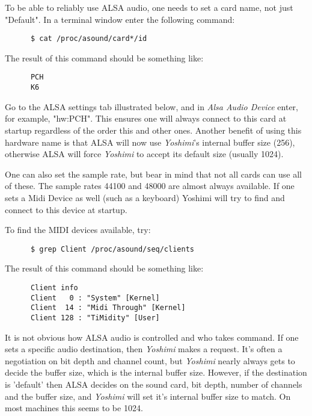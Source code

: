    To be able to reliably use ALSA audio, one needs to set a card name, not just
   "Default".  In a terminal window enter the following command:

   \begin{verbatim}
      $ cat /proc/asound/card*/id
   \end{verbatim}

   The result of this command should be something like:

   \begin{verbatim}
      PCH
      K6
   \end{verbatim}

   Go to the ALSA settings tab illustrated below, and in 
   \textsl{Alsa Audio Device} enter, for example, "hw:PCH".
   This ensures one will always connect to this card at startup regardless of
   the order this and other ones.  Another benefit of using this hardware name
   is that ALSA will now use \textsl{Yoshimi}'s internal
   buffer size (256), otherwise ALSA will force \textsl{Yoshimi} to accept its
   default size (usually 1024).

   One can also set the sample rate, but bear in mind that not all cards can use
   all of these.  The sample rates 44100 and 48000 are almost always available.
   If one sets a Midi Device as well (such as a keyboard) Yoshimi will try to
   find and connect to this device at startup.

   To find the MIDI devices available, try:

   \begin{verbatim}
      $ grep Client /proc/asound/seq/clients
   \end{verbatim}

   The result of this command should be something like:

   \begin{verbatim}
      Client info
      Client   0 : "System" [Kernel]
      Client  14 : "Midi Through" [Kernel]
      Client 128 : "TiMidity" [User]
   \end{verbatim}

   It is not obvious how ALSA audio is controlled and who takes command.  If
   one sets a specific audio destination, then \textsl{Yoshimi} makes a
   request.  It's often a negotiation on bit depth and channel count, but
   \textsl{Yoshimi} nearly always gets to decide the buffer size, which is the
   internal buffer size.  However, if the destination is 'default' then ALSA
   decides on the sound card, bit depth, number of channels and the buffer
   size, and \textsl{Yoshimi} will set it's internal buffer size to match.  On
   most machines this seems to be 1024.

